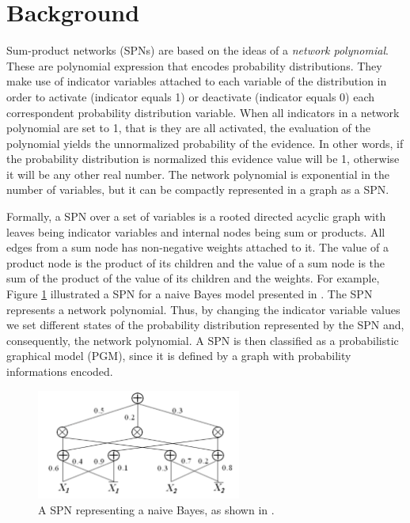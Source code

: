 \section{Background}
\label{sec:back}

Sum-product networks (SPNs) are based on the ideas of a \emph{network polynomial}.
These are polynomial expression that encodes probability distributions.
They make use of indicator variables attached to each variable of the distribution in order to activate (indicator equals 1) or deactivate (indicator equals 0) each correspondent probability distribution variable.
When all indicators in a network polynomial are set to 1, that is they are all activated, the evaluation of the polynomial yields the unnormalized probability of the evidence.
In other words, if the probability distribution is normalized this evidence value will be 1, otherwise it will be any other real number.
The network polynomial is exponential in the number of variables, but it can be compactly represented in a graph as a SPN.

Formally, a SPN over a set of variables is a rooted directed acyclic graph with leaves being indicator variables and internal nodes being sum or products.
All edges from a sum node has non-negative weights attached to it.
The value of a product node is the product of its children and the value of a sum node is the sum of the product of the value of its children and the weights.
For example, Figure \ref{fig:spn} illustrated a SPN for a naive Bayes model presented in \citep{Poon2011}.
The SPN represents a network polynomial.
Thus, by changing the indicator variable values we set different states of the probability distribution represented by the SPN and, consequently, the network polynomial.
A SPN is then classified as a probabilistic graphical model (PGM), since it is defined by a graph with probability informations encoded.

\begin{figure}[hbt]
    \begin{center}
    \includegraphics[width=0.6\textwidth]{figures/spn.png}
    \caption{A SPN representing a naive Bayes, as shown in \citep{Poon2011}.}
    \label{fig:spn}
    \end{center}
\end{figure}


